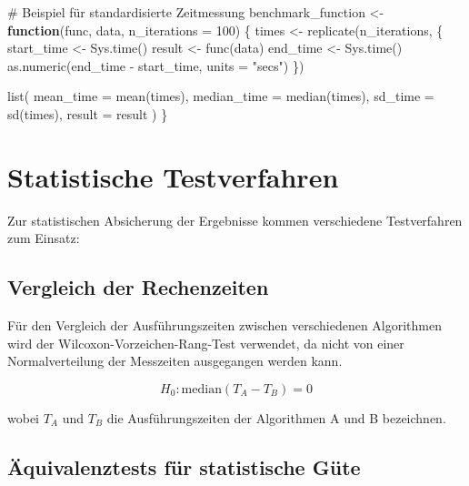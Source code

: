 \documentclass[
  ngerman,
  10pt,
  letterpaper,
]{book}
\newenvironment{Shaded}{\begin{snugshade}}{\end{snugshade}}
\newcommand{\AttributeTok}[1]{\textcolor[rgb]{0.40,0.45,0.13}{#1}}
\newcommand{\CommentTok}[1]{\textcolor[rgb]{0.37,0.37,0.37}{#1}}
\newcommand{\ControlFlowTok}[1]{\textcolor[rgb]{0.00,0.23,0.31}{\textbf{#1}}}
\newcommand{\DecValTok}[1]{\textcolor[rgb]{0.68,0.00,0.00}{#1}}
\newcommand{\FunctionTok}[1]{\textcolor[rgb]{0.28,0.35,0.67}{#1}}
\newcommand{\NormalTok}[1]{\textcolor[rgb]{0.00,0.23,0.31}{#1}}
\newcommand{\OtherTok}[1]{\textcolor[rgb]{0.00,0.23,0.31}{#1}}
\newcommand{\SpecialCharTok}[1]{\textcolor[rgb]{0.37,0.37,0.37}{#1}}
\newcommand{\StringTok}[1]{\textcolor[rgb]{0.13,0.47,0.30}{#1}}
\begin{document}
\begin{Shaded}
\begin{Highlighting}[]
\CommentTok{\# Beispiel für standardisierte Zeitmessung}
\NormalTok{benchmark\_function }\OtherTok{\textless{}{-}} \ControlFlowTok{function}\NormalTok{(func, data, }\AttributeTok{n\_iterations =} \DecValTok{100}\NormalTok{) \{}
\NormalTok{  times }\OtherTok{\textless{}{-}} \FunctionTok{replicate}\NormalTok{(n\_iterations, \{}
\NormalTok{    start\_time }\OtherTok{\textless{}{-}} \FunctionTok{Sys.time}\NormalTok{()}
\NormalTok{    result }\OtherTok{\textless{}{-}} \FunctionTok{func}\NormalTok{(data)}
\NormalTok{    end\_time }\OtherTok{\textless{}{-}} \FunctionTok{Sys.time}\NormalTok{()}
    \FunctionTok{as.numeric}\NormalTok{(end\_time }\SpecialCharTok{{-}}\NormalTok{ start\_time, }\AttributeTok{units =} \StringTok{"secs"}\NormalTok{)}
\NormalTok{  \})}
  
  \FunctionTok{list}\NormalTok{(}
    \AttributeTok{mean\_time =} \FunctionTok{mean}\NormalTok{(times),}
    \AttributeTok{median\_time =} \FunctionTok{median}\NormalTok{(times),}
    \AttributeTok{sd\_time =} \FunctionTok{sd}\NormalTok{(times),}
    \AttributeTok{result =}\NormalTok{ result}
\NormalTok{  )}
\NormalTok{\}}
\end{Highlighting}
\end{Shaded}

\section{Statistische Testverfahren}\label{statistische-testverfahren}

Zur statistischen Absicherung der Ergebnisse kommen verschiedene
Testverfahren zum Einsatz:

\subsection{Vergleich der
Rechenzeiten}\label{vergleich-der-rechenzeiten}

Für den Vergleich der Ausführungszeiten zwischen verschiedenen
Algorithmen wird der Wilcoxon-Vorzeichen-Rang-Test verwendet, da nicht
von einer Normalverteilung der Messzeiten ausgegangen werden kann.

\[H_0: \text{median}(T_A - T_B) = 0\]

wobei \(T_A\) und \(T_B\) die Ausführungszeiten der Algorithmen A und B
bezeichnen.

\subsection{Äquivalenztests für statistische
Güte}\label{uxe4quivalenztests-fuxfcr-statistische-guxfcte}
\end{document}
